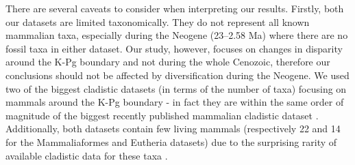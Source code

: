 \documentclass[12pt,letterpaper]{article}
\begin{document}
There are several caveats to consider when interpreting our results. 
Firstly, both our datasets are limited taxonomically.
They do not represent all known mammalian taxa, especially during the Neogene (23--2.58 Ma) where there are no fossil taxa in either dataset.
Our study, however, focuses on changes in disparity around the K-Pg boundary and not during the whole Cenozoic, therefore our conclusions should not be affected by diversification during the Neogene.
We used two of the biggest cladistic datasets (in terms of the number of taxa) focusing on mammals around the K-Pg boundary - in fact they are within the same order of magnitude of the biggest recently published mammalian cladistic dataset \citep[][ 157 coded Primates]{ni2013oldest}.
Additionally, both datasets contain few living mammals (respectively 22 and 14 for the Mammaliaformes and Eutheria datasets) due to the surprising rarity of available cladistic data for these taxa \citep{MissingMammals}. %



\end{document}
